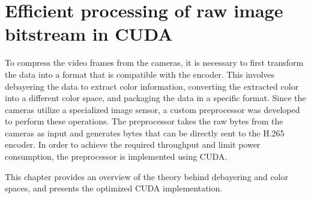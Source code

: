 \chapter{Efficient processing of raw image bitstream in CUDA}
\label{chap:debayer}

To compress the video frames from the cameras, it is necessary to first transform the data into a format that is compatible with the encoder.
This involves debayering the data to extract color information, converting the extracted color into a different color space, and packaging the data in a specific format.
Since the cameras utilize a specialized image sensor, a custom preprocessor was developed to perform these operations.
The preprocessor takes the raw bytes from the cameras as input and generates bytes that can be directly sent to the H.265 encoder.
In order to achieve the required throughput and limit power consumption, the preprocessor is implemented using CUDA.

This chapter provides an overview of the theory behind debayering and color spaces, and presents the optimized CUDA implementation.

